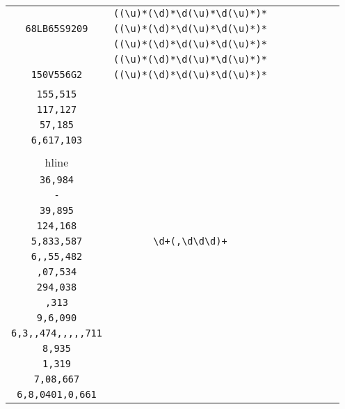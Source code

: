 \begin{longtable}{cccccccc}
\begin{tabular}{ll}
    \verb|Q6035NW8S7| & \verb|((\u)*(\d)*\d(\u)*\d(\u)*)*|\\
\verb|68LB65S9209| & \verb|((\u)*(\d)*\d(\u)*\d(\u)*)*|\\
\verb|| & \verb|((\u)*(\d)*\d(\u)*\d(\u)*)*|\\
\verb|| & \verb|((\u)*(\d)*\d(\u)*\d(\u)*)*|\\
\verb|150V556G2| & \verb|((\u)*(\d)*\d(\u)*\d(\u)*)*|
\end{tabular}
\\\midrule 
\begin{tabular}{l}
    \verb|6,820|\\
\verb|155,515|\\
\verb|117,127|\\
\verb|57,185|\\
\verb|6,617,103|\\
\\hline\\
\verb|36,984|\\
\verb|-|\\
\verb|39,895|\\
\verb|124,168|\\
\verb|5,833,587|
\end{tabular}

&
\verb|\d+(,\d\d\d)+|
&

\begin{tabular}{l}
    \verb|(\d)*,((\d)*,)*\d\d\d|\\
\verb|6,,55,482|\\
\verb|,07,534|\\
\verb|294,038|\\
\verb|,313|\\
\verb|9,6,090|
\end{tabular}

&

\begin{tabular}{l}
    \verb|(\d)*\d,((\d)*,)*\d\d\d|\\
\verb|6,3,,474,,,,,711|\\
\verb|8,935|\\
\verb|1,319|\\
\verb|7,08,667|\\
\verb|6,8,0401,0,661|
\end{tabular}

&


\end{longtable}
